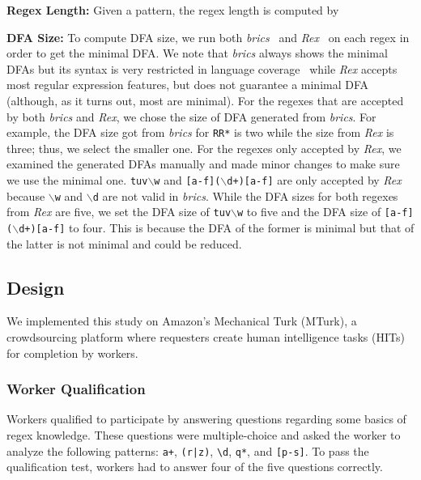 \textbf{Regex Length:} 
Given a pattern, the regex length is computed by 

\textbf{DFA Size:} 
To compute DFA size, we run both \textit{brics}~\cite{brics} and \textit{Rex}~\cite{rex} on each regex in order to get the minimal DFA. We note that \textit{brics} always shows the minimal DFAs but its syntax is very restricted in language coverage~\cite{chapman2016} while \textit{Rex} accepts most regular expression features, but does not guarantee a minimal DFA (although, as it turns out, most are minimal). %
For the regexes that are accepted by both \textit{brics} and \textit{Rex}, we chose the size of DFA generated from \textit{brics}. For example, the DFA size got from \textit{brics} for {\tt RR*} is two while the size  from \textit{Rex} is three; thus, we select the smaller one.
 For the regexes only accepted by \textit{Rex}, we examined the generated DFAs manually and made minor changes to make sure we use the minimal one. {\tt tuv$\backslash$w} and {\tt [a-f]($\backslash$d+)[a-f]} are only accepted by \textit{Rex} because {\tt $\backslash$w} and {\tt $\backslash$d} are not valid in \textit{brics}. While the DFA sizes for both regexes from \textit{Rex} are five, we set the DFA size of {\tt tuv$\backslash$w} to five and the DFA size of {\tt [a-f]($\backslash$d+)[a-f]} to four. This is because the DFA of the former is minimal but that of the latter is not minimal and could be reduced.

\subsection{Design}
We implemented this study on  Amazon's Mechanical Turk (MTurk),  a crowdsourcing platform where requesters create human intelligence tasks (HITs) for completion by workers.

\subsubsection{Worker Qualification}
Workers qualified to participate  by answering questions regarding some basics of regex knowledge. These questions were multiple-choice and asked the worker to analyze the following patterns: \verb!a+!, \verb!(r|z)!, \verb!\d!, \verb!q*!, and \verb![p-s]!. To pass the qualification test, workers had to answer four of the five questions correctly.

